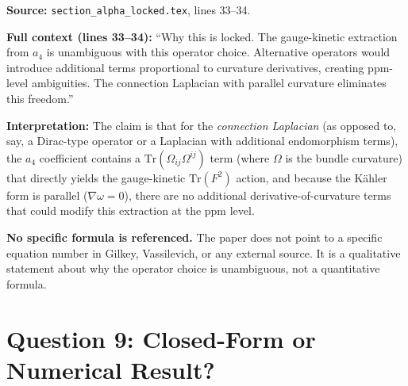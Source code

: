 \documentclass[12pt,a4paper]{article}
\begin{document}
\begin{tcolorbox}[colback=yellow!5!white, colframe=yellow!50!black,
  title=Answer: It means the connection Laplacian with parallel curvature
  produces a unique $\mathrm{Tr}(F^2)$ term]

\textbf{Source:} \texttt{section\_alpha\_locked.tex}, lines 33--34.

\textbf{Full context (lines 33--34):}
``Why this is locked. The gauge-kinetic extraction from $a_4$ is unambiguous
with this operator choice.  Alternative operators would introduce additional
terms proportional to curvature derivatives, creating ppm-level ambiguities.
The connection Laplacian with parallel curvature eliminates this freedom.''

\textbf{Interpretation:}
The claim is that for the \emph{connection Laplacian} (as opposed to, say,
a Dirac-type operator or a Laplacian with additional endomorphism terms),
the $a_4$ coefficient contains a $\mathrm{Tr}(\Omega_{ij}\Omega^{ij})$ term
(where $\Omega$ is the bundle curvature) that directly yields the
gauge-kinetic $\mathrm{Tr}(F^2)$ action, and because the K\"ahler form is
parallel ($\nabla\omega = 0$), there are no additional derivative-of-curvature
terms that could modify this extraction at the ppm level.

\textbf{No specific formula is referenced.}  The paper does not point to
a specific equation number in Gilkey, Vassilevich, or any external source.
It is a qualitative statement about why the operator choice is unambiguous,
not a quantitative formula.
\end{tcolorbox}

\section{Question 9: Closed-Form or Numerical Result?}
\label{sec:q9}
\end{document}
